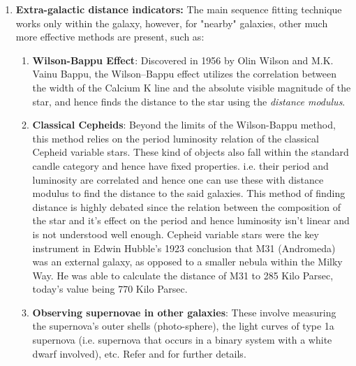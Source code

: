 \documentclass[a4paper,twoside,11pt]{article}
\makeatletter
\numberwithin{equation}{section}
\renewcommand\paragraph{\@startsection{paragraph}{5}{\z@}%
  {3.25ex \@plus1ex \@minus.2ex}%
  {-1em}%
  {\normalfont\normalsize\bfseries}}
\makeatother
\begin{document}
\begin{enumerate}
    \paragraph{}
    Now, when these stars are in the main sequence, they have a certain spectrum, which when we measure, we can find it's location in the main sequence, which would, in turn, tell us about it's luminosity (remember standard candles) and hence it's absolute magnitude can be estimated. A comparison of this value with the apparent magnitude of the star allows us to calculate the approximate distance to the star after making interstellar dust corrections. This essentially means, we are trying to find where the star from a said cluster belongs within the main sequence and inferring from that it's luminosity and hence it's distance. 
    \item \textbf{Extra-galactic distance indicators:} The main sequence fitting technique works only within the galaxy, however, for "nearby" galaxies, other much more effective methods are present, such as:
    \begin{enumerate}
        \item \textbf{Wilson-Bappu Effect}: Discovered in 1956 by Olin Wilson and M.K. Vainu Bappu, the Wilson–Bappu effect utilizes the correlation between the width of the Calcium K line and the absolute visible magnitude of the star, and hence finds the distance to the star using the \textit{distance modulus}.
        \item \textbf{Classical Cepheids}: Beyond the limits of the Wilson-Bappu method, this method relies on the period luminosity relation of the classical Cepheid variable stars. These kind of objects also fall within the standard candle category and hence have fixed properties. i.e. their period and luminosity are correlated and hence one can use these with distance modulus to find the distance to the said galaxies. This method of finding distance is highly debated since the relation between the composition of the star and it's effect on the period and hence luminosity isn't linear and is not understood well enough. Cepheid variable stars were the key instrument in Edwin Hubble's 1923 conclusion that M31 (Andromeda) was an external galaxy, as opposed to a smaller nebula within the Milky Way. He was able to calculate the distance of M31 to 285 Kilo Parsec, today's value being 770 Kilo Parsec. 
        \item \textbf{Observing supernovae in other galaxies}: These involve measuring the supernova's outer shells (photo-sphere), the light curves of type 1a supernova (i.e. supernova that occurs in a binary system with a white dwarf involved), etc. Refer \cite{ARC} and \cite{BasuIntro} for further details. 

\end{enumerate}
\end{enumerate}
\end{document}
